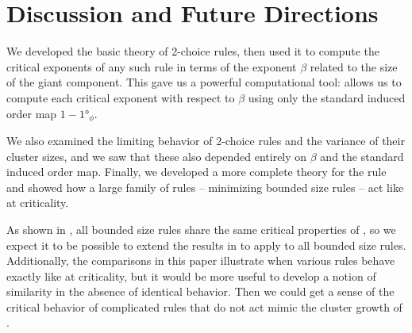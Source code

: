 \documentclass[twoside,10pt]{article}
\begin{document}



\section{Discussion and Future Directions}

We developed the basic theory of 2-choice rules, then used it to compute the critical exponents of any such rule in terms of the exponent $\beta$ related to the size of the giant component. This gave us a powerful computational tool:  allows us to compute each critical exponent with respect to $\beta$ using only the standard induced order map $1 - \ang{1}_{\phi}$.

We also examined the limiting behavior of 2-choice rules and the variance of their cluster sizes, and we saw that these also depended entirely on $\beta$ and the standard induced order map. Finally, we developed a more complete theory for the \ER rule and showed how a large family of rules -- minimizing bounded size rules -- act like \ER at criticality.

As shown in \cite{RW-bounded}, all bounded size rules share the same critical properties of \ER, so we expect it to be possible to extend the results in  to apply to all bounded size rules. Additionally, the \ER comparisons in this paper illustrate when various rules behave exactly like \ER at criticality, but it would be more useful to develop a notion of similarity in the absence of identical behavior. Then we could get a sense of the critical behavior of complicated rules that do not act mimic the cluster growth of \ER.

\printbibliography
\end{document}
